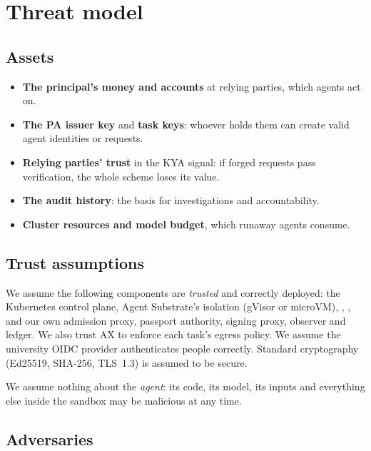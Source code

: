 \section{Threat model}\label{sec:threats}

\subsection{Assets}

\begin{itemize}
  \item \textbf{The principal's money and accounts} at relying parties, which agents act on.
  \item \textbf{The PA issuer key} and \textbf{task keys}: whoever holds them can create valid agent identities or requests.
  \item \textbf{Relying parties' trust} in the KYA signal: if forged requests pass verification, the whole scheme loses its value.
  \item \textbf{The audit history}: the basis for investigations and accountability.
  \item \textbf{Cluster resources and model budget}, which runaway agents consume.
\end{itemize}

\subsection{Trust assumptions}

We assume the following components are \emph{trusted} and correctly deployed: the Kubernetes control plane, Agent Substrate's isolation (gVisor or microVM), , , and our own admission proxy, passport authority, signing proxy, observer and ledger. We also trust AX to enforce each task's  egress policy. We assume the university OIDC provider authenticates people correctly. Standard cryptography (Ed25519, SHA-256, TLS~1.3) is assumed to be secure.

We assume nothing about the \emph{agent}: its code, its model, its inputs and everything else inside the sandbox may be malicious at any time.

\subsection{Adversaries}

